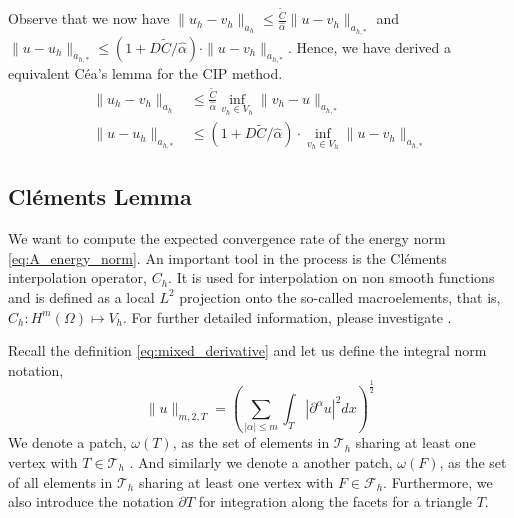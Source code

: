 Observe that we now have $ \| u_{h} - v_{h} \|_{ a_{h} }^{  }   \le \frac{\widetilde{C}}{\hat{\alpha }}  \| u - v_{h} \|_{ a_{h, *} }^{  }$ and $\| u - u_{h} \|_{ a_{h,*} }^{  }   \le \left( 1 + D \widetilde{C} /\hat{\alpha } \right)\cdot  \| u -
v_{h} \|_{ a_{h,*} }^{  } $. Hence, we have derived a equivalent Céa's lemma for the CIP method.
\[
    \begin{split}
\| u_{h} - v_{h} \|_{ a_{h} }^{  }  & \le \frac{\widetilde{C}}{\hat{\alpha }}  \inf_{v_{h} \in  V_{h}} \|  v_{h} - u \|_{ a_{h, *} }^{  } \\
\| u - u_{h} \|_{ a_{h,*} }^{  }  & \le \left( 1 + D \widetilde{C} /\hat{\alpha } \right)\cdot \inf_{v_{h} \in  V_{h}}   \| u - v_{h} \|_{ a_{h,*} }^{  }
    \end{split}
\]



\subsection{Cléments Lemma}%
\label{sub:clements_lemma}


We want to compute the expected convergence rate of the energy norm \eqref{eq:A_energy_norm}. An important tool in the process is the Cléments interpolation operator, $C_{h}$.
It is used for interpolation on non smooth functions and is defined as a local $L^{2}$ projection onto the so-called macroelements, that is, $C_{h}: H^{m} \left( \Omega  \right) \mapsto V_{h}$. For further detailed information, please investigate \cite{ern04}.


Recall the definition \eqref{eq:mixed_derivative} and let us define the integral norm notation,
\[
\| u \|_{ m,2,T }^{  } = \left( \sum_{ \left\lvert \alpha  \right\rvert \le m}^{} \int_{T}^{}  \left\lvert  \partial ^{\alpha } u \right\rvert^{2} dx   \right)^{\frac{1}{2}}
\]
We denote a patch, $\omega \left( T \right) $, as the set of elements in $\mathcal{T} _{h}$  sharing at least one vertex with $T \in \mathcal{T} _{h}$ . And similarly we denote a another patch, $\omega \left( F \right) $, as the set of all elements in $\mathcal{T}_{h} $
sharing at least one vertex with $F \in  \mathcal{F} _{h}$.
Furthermore, we also introduce the notation $\partial T$ for integration along the facets for a triangle $T$.

